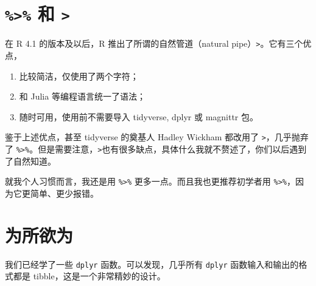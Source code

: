 \documentclass[
  letterpaper,
]{ctexbook}
\providecommand{\tightlist}{%
  \setlength{\itemsep}{0pt}\setlength{\parskip}{0pt}}\usepackage{longtable,booktabs,array}
\begin{document}
\hypertarget{ux548c}{%
\section{\texorpdfstring{\texttt{\%\textgreater{}\%} 和
\texttt{\textbar{}\textgreater{}}}{\%\textgreater\% 和 \textbar\textgreater{}}}\label{ux548c}}

在 R 4.1 的版本及以后，R 推出了所谓的自然管道（natural
pipe）\texttt{\textbar{}\textgreater{}}。它有三个优点，

\begin{enumerate}
\def\labelenumi{\arabic{enumi}.}
\tightlist
\item
  比较简洁，仅使用了两个字符；
\item
  和 Julia 等编程语言统一了语法；
\item
  随时可用，使用前不需要导入 tidyverse, dplyr 或 magnittr 包。
\end{enumerate}

鉴于上述优点，甚至 tidyverse 的奠基人 Hadley Wickham 都改用了
\texttt{\textbar{}\textgreater{}}，几乎抛弃了
\texttt{\%\textgreater{}\%}。但是需要注意，\texttt{\textbar{}\textgreater{}}也有很多缺点，具体什么我就不赘述了，你们以后遇到了自然知道。

就我个人习惯而言，我还是用 \texttt{\%\textgreater{}\%}
更多一点。而且我也更推荐初学者用
\texttt{\%\textgreater{}\%}，因为它更简单、更少报错。

\hypertarget{sec-wei}{%
\section{为所欲为}\label{sec-wei}}

我们已经学了一些 \texttt{dplyr} 函数。可以发现，几乎所有 \texttt{dplyr}
函数输入和输出的格式都是 tibble，这是一个非常精妙的设计。
\end{document}

